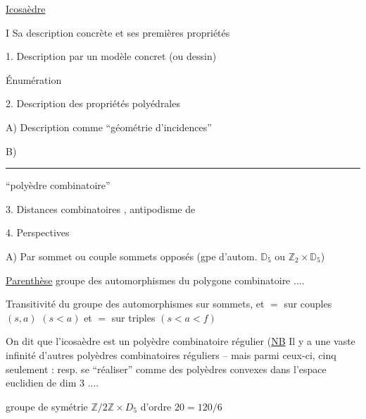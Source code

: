 

\uline{Icosaèdre}

I Sa description concrète et ses premières propriétés

1. Description  par un modèle concret (ou dessin)

 Énumération


2. Description des propriétés polyédrales


A) Description comme ``géométrie d'incidences''

B) \rule{3cm}{0.35pt} ``polyèdre combinatoire'' 

3. Distances combinatoires \unsure{,}  , antipodisme de 

4. Perspectives

A) Par sommet ou couple sommets opposés (gpe d'autom. $\mathbb D_5$ ou $\mathbb Z_2\times\mathbb D_5$)


\uline{Parenthèse} groupe des automorphismes du polygone combinatoire ....

Transitivité du groupe des automorphismes sur sommets, et $=$ sur couples $(s,a)$ $(s<a)$ et $=$ sur triples $(s<a<f)$

On dit que l'icosaèdre est un polyèdre combinatoire régulier (\uline{NB} Il y a une vaste infinité d'autres polyèdres combinatoires réguliers -- mais parmi ceux-ci, cinq seulement : resp.  se ``réaliser'' comme des polyèdres convexes dans l'espace euclidien de dim 3 ....



groupe de symétrie $\mathbb Z/2\mathbb Z\times D_5$ d'ordre $20=120/6$

